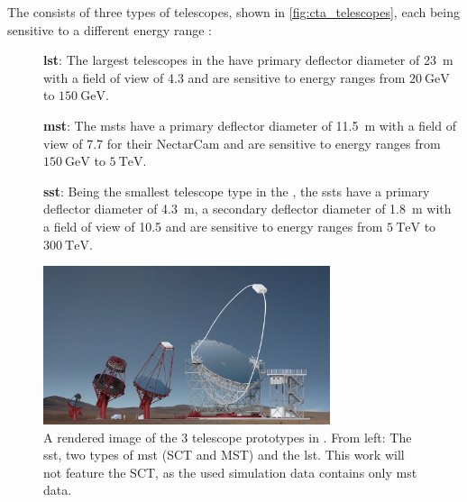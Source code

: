 The \cta{} consists of three types of telescopes, shown in \autoref{fig:cta_telescopes}, each being
sensitive to a different energy range \cite{cta_specs}:
\begin{description}
    \item [] \textbf{\gls{lst}}: The largest telescopes in the \cta{} have primary deflector diameter
    of \SI{23}{\meter} with a field of view of \SI{4.3}{\deg} and are sensitive to energy
    ranges from \(\SI{20}{\giga\eV}\) to \(\SI{150}{\giga\eV}\).
    \item [] \textbf{\gls{mst}}: The \glspl{mst} have a primary deflector diameter of \SI{11.5}{\meter}
    with a field of view of \SI{7.7}{\deg} for their NectarCam and are sensitive to energy ranges
    from \(\SI{150}{\giga\eV}\) to \(\SI{5}{\tera\eV}\).
    \item [] \textbf{\gls{sst}}: Being the smallest telescope type in the \cta{}, the \glspl{sst}
    have a primary deflector diameter of \SI{4.3}{\meter}, a secondary deflector diameter of
    \SI{1.8}{\meter} with a field of view of \SI{10.5}{\deg} and are sensitive to energy ranges
    from \(\SI{5}{\tera\eV}\) to \(\SI{300}{\tera\eV}\).
\end{description}

\begin{figure}
    \centering
    \includegraphics[width=0.75\textwidth]{graphics/telescopes_render.jpg}
    \caption{A rendered image of the 3 telescope prototypes in \cta{}. From left: The \gls{sst},
    two types of \gls{mst} (SCT and MST) and the \gls{lst}. This work will not feature the SCT, as
    the used simulation data contains only \gls{mst} data.}
    \label{fig:cta_telescopes}
\end{figure}

